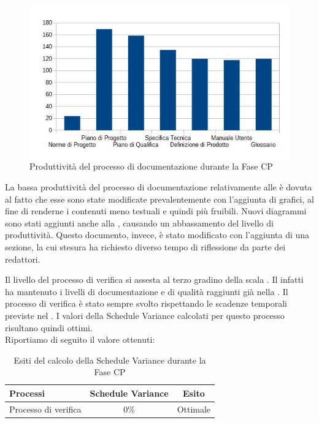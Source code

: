 \begin{figure}[H]
	\centering
		\includegraphics[width=12cm]{PianoDiQualifica/Pics/ProduttivitaDocumentazioneFaseCP.jpg}
	\caption{Produttività del processo di documentazione durante la Fase CP}
\end{figure}
La bassa produttività del processo di documentazione relativamente alle  è dovuta al fatto che esse sono state modificate prevalentemente con l'aggiunta di grafici, al fine di renderne i contenuti meno testuali e quindi più fruibili. Nuovi diagrammi sono stati aggiunti anche alla , causando un abbassamento del livello di produttività. Questo documento, invece, è stato modificato con l'aggiunta di una sezione, la cui stesura ha richiesto diverso tempo di riflessione da parte dei redattori.

	Il livello del processo di verifica si assesta al terzo gradino della scala . Il \groupname{} infatti ha mantenuto i livelli di documentazione e di qualità raggiunti già nella .
	Il processo di verifica è stato sempre svolto rispettando le scadenze temporali previste nel . I valori della Schedule Variance calcolati per questo processo risultano quindi ottimi.\\
			Riportiamo di seguito il valore ottenuti:
			\begin{table}[H]
				\centering
				\begin{tabu}{| l | c | c |}
					\hline
						Processi 							& Schedule Variance	& Esito		\\ \hline \hline
						Processo di verifica & 0\% & Ottimale \\ \hline
				\end{tabu}
				\caption{Esiti del calcolo della Schedule Variance durante la Fase CP}
			\end{table}	

